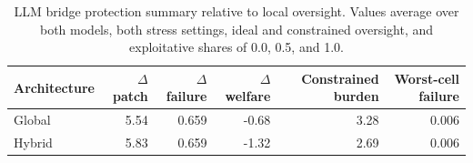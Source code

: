 \begin{table}[t]
    \centering
    \caption{LLM bridge protection summary relative to local oversight. Values average over both models, both stress settings, ideal and constrained oversight, and exploitative shares of 0.0, 0.5, and 1.0.}
    \label{tab:llm-bridge-outcomes}
    \begin{tabular}{lrrrrr}
        \toprule
        Architecture & $\Delta$ patch & $\Delta$ failure & $\Delta$ welfare & Constrained burden & Worst-cell failure \\
        \midrule
        Global & 5.54 & 0.659 & -0.68 & 3.28 & 0.006 \\
        Hybrid & 5.83 & 0.659 & -1.32 & 2.69 & 0.006 \\
        \bottomrule
    \end{tabular}
\end{table}

